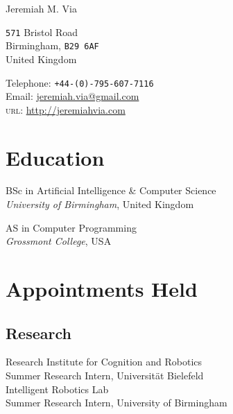\documentclass[10pt, a4paper]{article}
\newcommand{\years}[1]{\marginnote{\scriptsize #1}}
\begin{document}
{\LARGE Jeremiah M. Via}\\[1cm]
\begin{minipage}[t]{0.55\textwidth}
  \texttt{571} Bristol Road\\
  Birmingham, \texttt{B29 6AF}\\
  United Kingdom
\end{minipage}
\begin{minipage}[t]{0.4\textwidth}
  Telephone: \texttt{+44-(0)-795-607-7116}\\
  Email: \href{mailto:jeremiah.via@gmail.com}{jeremiah.via@gmail.com}\\
  \textsc{url}: \href{http://jeremiahvia.com}{http://jeremiahvia.com}
\end{minipage}


\section*{Education}

\years{2012}
\textmd{BSc in Artificial Intelligence \& Computer Science}\\
\textit{University of Birmingham}, United Kingdom\\[.2cm]
\years{2009}

\textmd{AS in Computer Programming}\\
\textit{Grossmont College}, USA

\section*{Appointments Held}

\subsection*{Research}
\years{2011}
\textmd{Research Institute for Cognition and Robotics}\\
Summer Research Intern, Universität Bielefeld\\[.2cm]
\textmd{Intelligent Robotics Lab}\\
Summer Research Intern, University of Birmingham
\end{document}
